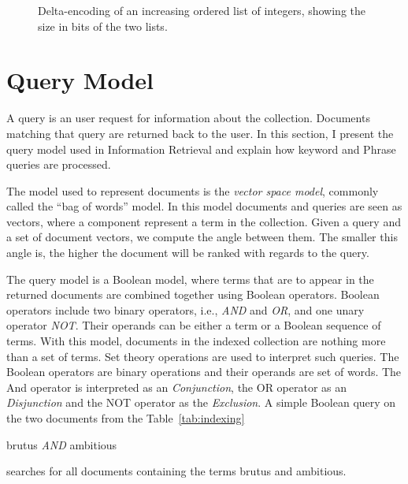 \begin{figure}
\centering
{}%
\caption{Delta-encoding of an increasing ordered list of integers, showing the
size in bits of the two lists.}
\label{fig:delta-encoding}
\end{figure}

\section{Query Model}
\label{sec:query-model}

A query is an user request for information about the collection. Documents
matching that query are returned back to the user. In this section, I present
the query model used in Information Retrieval and explain how keyword and
Phrase queries are processed.

The model used to represent documents is the \emph{vector space model},
commonly called the ``bag of words'' model. In this model documents and
queries are seen as vectors, where a component represent a term in the
collection. Given a query and a set of document vectors, we compute the angle
between them. The smaller this angle is, the higher the document will be
ranked with regards to the query.

The query model is a Boolean model, where terms that are to appear in the
returned documents are combined together using Boolean operators. Boolean
operators include two binary operators, i.e., \emph{AND} and \emph{OR}, and one
unary operator \emph{NOT}. Their operands can be either a term or a Boolean
sequence of terms. With this model, documents in the indexed collection are
nothing more than a set of terms. Set theory operations are used to interpret
such queries. The Boolean operators are binary operations and their operands are
set of words. The And operator is interpreted as an \emph{Conjunction},
the OR operator as an \emph{Disjunction} and the NOT operator as the
\emph{Exclusion}. A simple Boolean query on the two documents from the
Table~\ref{tab:indexing}
\begin{center}
brutus \emph{AND} ambitious
\end{center}
searches for all documents containing the terms brutus and ambitious.

